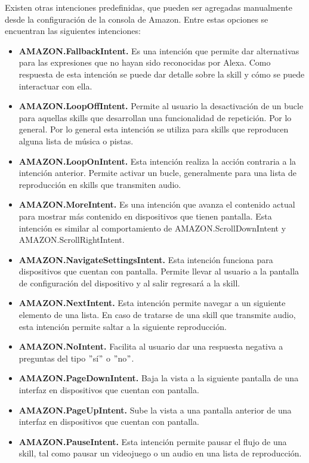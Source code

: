 Existen otras intenciones predefinidas, que pueden ser agregadas manualmente desde la configuración de la consola de Amazon. Entre estas opciones se encuentran las siguientes intenciones:

\begin{itemize}
  \item \textbf{AMAZON.FallbackIntent.} Es una intención que permite dar alternativas para las expresiones que no hayan sido reconocidas por Alexa. Como respuesta de esta intención se puede dar detalle sobre la skill y cómo se puede interactuar con ella.
  \item \textbf{AMAZON.LoopOffIntent.} Permite al usuario la desactivación de un bucle para aquellas skills que desarrollan una funcionalidad de repetición. Por lo general. Por lo general esta intención se utiliza para skills que reproducen alguna lista de música o pistas.
  \item \textbf{AMAZON.LoopOnIntent.} Esta intención realiza la acción contraria a la intención anterior. Permite activar un bucle, generalmente para una lista de reproducción en skills que transmiten audio.
  \item \textbf{AMAZON.MoreIntent.} Es una intención que avanza el contenido actual para mostrar más contenido en dispositivos que tienen pantalla. Esta intención es similar al comportamiento de AMAZON.ScrollDownIntent y AMAZON.ScrollRightIntent.
  \item \textbf{AMAZON.NavigateSettingsIntent.} Esta intención funciona para dispositivos que cuentan con pantalla. Permite llevar al usuario a la pantalla de configuración del dispositivo y al salir regresará a la skill.
  \item \textbf{AMAZON.NextIntent.} Esta intención permite navegar a un siguiente elemento de una lista. En caso de tratarse de una skill que transmite audio, esta intención permite saltar a la siguiente reproducción.
  \item \textbf{AMAZON.NoIntent.} Facilita al usuario dar una respuesta negativa a preguntas del tipo $"$sí$"$ o $"$no$"$.
  \item \textbf{AMAZON.PageDownIntent.} Baja la vista a la siguiente pantalla de una interfaz en dispositivos que cuentan con pantalla.
  \item \textbf{AMAZON.PageUpIntent.} Sube la vista a una pantalla anterior de una interfaz en dispositivos que cuentan con pantalla.
  \item \textbf{AMAZON.PauseIntent.} Esta intención permite pausar el flujo de una skill, tal como pausar un videojuego o un audio en una lista de reproducción.

\end{itemize}
